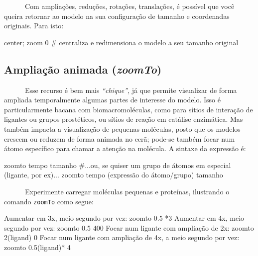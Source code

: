 \documentclass[
  letterpaper,
  DIV=11,
  numbers=noendperiod]{scrreprt}
\newenvironment{Shaded}{\begin{snugshade}}{\end{snugshade}}
\newcommand{\CommentTok}[1]{\textcolor[rgb]{0.37,0.37,0.37}{#1}}
\newcommand{\DecValTok}[1]{\textcolor[rgb]{0.68,0.00,0.00}{#1}}
\newcommand{\FloatTok}[1]{\textcolor[rgb]{0.68,0.00,0.00}{#1}}
\newcommand{\FunctionTok}[1]{\textcolor[rgb]{0.28,0.35,0.67}{#1}}
\newcommand{\NormalTok}[1]{\textcolor[rgb]{0.00,0.23,0.31}{#1}}
\newcommand{\SpecialCharTok}[1]{\textcolor[rgb]{0.37,0.37,0.37}{#1}}
\begin{document}
~~~~~~Com ampliações, reduções, rotações, translações, é possível que
você queira retornar ao modelo na sua configuração de tamanho e
coordenadas originais. Para isto:

\begin{Shaded}
\begin{Highlighting}[]
\NormalTok{center; zoom }\DecValTok{0} \CommentTok{\# centraliza e redimensiona o modelo a seu tamanho original}
\end{Highlighting}
\end{Shaded}

\subsection{\texorpdfstring{Ampliação animada
(\emph{zoomTo})}{Ampliação animada (zoomTo)}}\label{ampliauxe7uxe3o-animada-zoomto}

~~~~~~Esse recurso é bem mais \emph{``chique''}, já que permite
visualizar de forma ampliada temporalmente algumas partes de interesse
do modelo. Isso é particularmente bacana com biomacromoléculas, como
para sítios de interação de ligantes ou grupos prostéticos, ou sítios de
reação em catálise enzimática. Mas também impacta a visualização de
pequenas moléculas, posto que os modelos crescem ou reduzem de forma
animada no ecrã; pode-se também focar num átomo específico para chamar a
atenção na molécula. A sintaxe da expressão é:

\begin{Shaded}
\begin{Highlighting}[]
\NormalTok{zoomto tempo tamanho }\CommentTok{\#...ou, se quiser um grupo de átomos em especial (ligante, por ex)...}
\NormalTok{zoomto }\FunctionTok{tempo}\NormalTok{ (expressão do átomo}\SpecialCharTok{/}\NormalTok{grupo) tamanho}
\end{Highlighting}
\end{Shaded}

~~~~~~Experimente carregar moléculas pequenas e proteínas, ilustrando o
comando \texttt{zoomTo} como segue:

\begin{Shaded}
\begin{Highlighting}[]
\NormalTok{Aumentar em }\DecValTok{3}\NormalTok{x, meio segundo por vez}\SpecialCharTok{:}\NormalTok{ zoomto }\FloatTok{0.5} \SpecialCharTok{*}\DecValTok{3} 
\NormalTok{Aumentar em }\DecValTok{4}\NormalTok{x, meio segundo por vez}\SpecialCharTok{:}\NormalTok{ zoomto }\FloatTok{0.5} \DecValTok{400} 
\NormalTok{Focar num ligante com ampliação de }\DecValTok{2}\NormalTok{x}\SpecialCharTok{:}\NormalTok{ zoomto }\DecValTok{2}\NormalTok{(ligand) }\DecValTok{0}
\NormalTok{Focar num ligante com ampliação de }\DecValTok{4}\NormalTok{x, a meio segundo por vez}\SpecialCharTok{:}\NormalTok{ zoomto }\FloatTok{0.5}\NormalTok{(ligand)}\SpecialCharTok{*} \DecValTok{4}
\end{Highlighting}
\end{Shaded}
\end{document}
